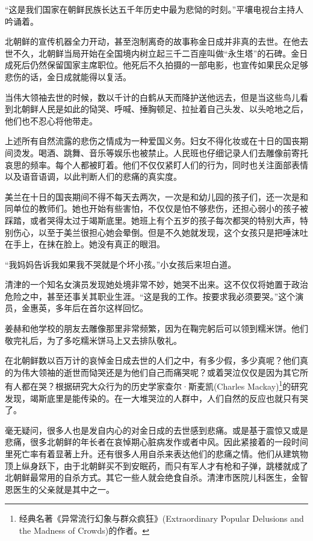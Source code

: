“这是我们国家在朝鲜民族长达五千年历史中最为悲恸的时刻。”平壤电视台主持人吟诵着。

北朝鲜的宣传机器全力开动，甚至泡制离奇的故事称金日成并非真的去世。在他去世不久，北朝鲜当局开始在全国境内树立起三千二百座叫做“永生塔”的石碑。金日成死后仍然保留国家主席职位。他死后不久拍摄的一部电影，也宣传如果民众足够悲伤的话，金日成就能得以复活。

当伟大领袖去世的时候，数以千计的白鹤从天而降护送他远去，但是当这些鸟儿看到北朝鲜人民是如此的恸哭、呼喊、捶胸顿足、拉扯着自己头发、以头呛地之后，他们也不忍心将他带走。

上述所有自然流露的悲伤之情成为一种爱国义务。妇女不得化妆或在十日的国丧期间烫发。喝酒、跳舞、音乐等娱乐也被禁止。人民班也仔细记录人们去雕像前寄托哀思的频率。每个人都被盯着。他们不仅仅紧盯人们的行为，同时也关注面部表情以及语音语调，以此判断人们的悲痛的真实度。

美兰在十日的国丧期间不得不每天去两次，一次是和幼儿园的孩子们，还一次是和同单位的教师们。她也开始有些害怕，不仅仅是怕不够悲伤，还担心弱小的孩子被踩踏，或者哭得太过于竭斯底里。她班上有个五岁的孩子每次都哭的特别大声，特别伤心，以至于美兰很担心她会晕倒。但是不久她就发现，这个女孩只是把唾沫吐在手上，在抹在脸上。她没有真正的眼泪。

“我妈妈告诉我如果我不哭就是个坏小孩。”小女孩后来坦白道。

清津的一个知名女演员发现她处境非常不妙，她哭不出来。这不仅仅将她置于政治危险之中，甚至还事关其职业生涯。“这是我的工作。按要求我必须要哭。”这个演员，金惠英，多年后在首尔这样回忆。

姜赫和他学校的朋友去雕像那里非常频繁，因为在鞠完躬后可以领到糯米饼。他们敬完礼后，为了多吃糯米饼马上又去排队敬礼。

在北朝鲜数以百万计的哀悼金日成去世的人们之中，有多少假，多少真呢？他们真的为伟大领袖的逝世而恸哭还是为他们自己而痛哭呢？或着哭泣仅仅是因为其它所有人都在哭？根据研究大众行为的历史学家查尔·斯麦凯(Charles Mackay)\footnote{经典名著《异常流行幻象与群众疯狂》(Extraordinary Popular Delusions and the Madness of Crowds)的作者。}的研究发现，竭斯底里是能传染的。在一大堆哭泣的人群中，人们自然的反应也就只有哭了。

毫无疑问，很多人也是发自内心的对金日成的去世感到悲痛。或是基于震惊又或是悲痛，很多北朝鲜的年长者在哀悼期心脏病发作或者中风。因此紧接着的一段时间里死亡率有着显著上升。还有很多人用自杀来表达他们的悲痛之情。他们从建筑物顶上纵身跃下，由于北朝鲜买不到安眠药，而只有军人才有枪和子弹，跳楼就成了北朝鲜最常用的自杀方式。其它一些人就会绝食自杀。清津市医院儿科医生，金智恩医生的父亲就是其中之一。
